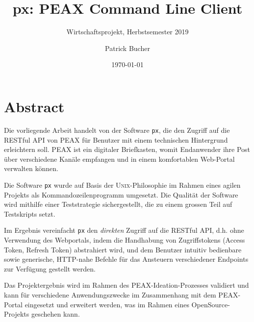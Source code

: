 \author{Patrick Bucher}
\title{px: PEAX Command Line Client}
\subtitle{Wirtschaftsprojekt, Herbstsemester 2019}
\date{\today}
\maketitle
\thispagestyle{empty}

\section*{Abstract}

Die vorliegende Arbeit handelt von der Software \texttt{px}, die den Zugriff auf die RESTful API von PEAX für Benutzer mit einem technischen Hintergrund erleichtern soll. PEAX ist ein digitaler Briefkasten, womit Endanwender ihre Post über verschiedene Kanäle empfangen und in einem komfortablen Web-Portal verwalten können.

Die Software \texttt{px} wurde auf Basis der \textsc{Unix}-Philosophie im Rahmen eines agilen Projekts als Kommandozeilenprogramm umgesetzt. Die Qualität der Software wird mithilfe einer Teststrategie sichergestellt, die zu einem grossen Teil auf Testskripts setzt.

Im Ergebnis vereinfacht \texttt{px} den \textit{direkten} Zugriff auf die RESTful API, d.h. ohne Verwendung des Webportals, indem die Handhabung von Zugriffstokens (Access Token, Refresh Token) abstrahiert wird, und dem Benutzer intuitiv bedienbare sowie generische, HTTP-nahe Befehle für das Ansteuern verschiedener Endpoints zur Verfügung gestellt werden.

Das Projektergebnis wird im Rahmen des PEAX-Ideation-Prozesses validiert und kann für verschiedene Anwendungszwecke im Zusammenhang mit dem PEAX-Portal eingesetzt und erweitert werden, was im Rahmen eines OpenSource-Projekts geschehen kann.

\vfill

